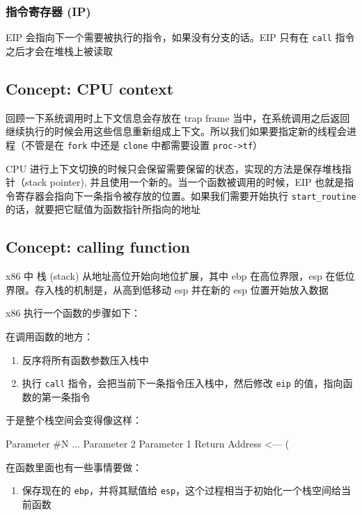 \subsubsection{指令寄存器 (IP)}

EIP 会指向下一个需要被执行的指令，如果没有分支的话。EIP 只有在 \texttt{call} 指令之后才会在堆栈上被读取

\subsection{Concept: CPU context}

回顾一下系统调用时上下文信息会存放在 trap frame 当中，在系统调用之后返回继续执行的时候会用这些信息重新组成上下文。所以我们如果要指定新的线程会进程（不管是在 \texttt{fork} 中还是 \texttt{clone} 中都需要设置 \texttt{proc->tf}）

CPU 进行上下文切换的时候只会保留需要保留的状态，实现的方法是保存堆栈指针（stack pointer), 并且使用一个新的。当一个函数被调用的时候，EIP 也就是指令寄存器会指向下一条指令被存放的位置。如果我们需要开始执行 \texttt{start\_routine} 的话，就要把它赋值为函数指针所指向的地址

\subsection{Concept: calling function}

x86 中 栈 (stack) 从地址高位开始向地位扩展，其中 ebp 在高位界限，esp 在低位界限。存入栈的机制是，从高到低移动 esp 并在新的 esp 位置开始放入数据

x86 执行一个函数的步骤如下：

在调用函数的地方：

\begin{enumerate}
	\item 反序将所有函数参数压入栈中
	\item 执行 \texttt{call} 指令，会把当前下一条指令压入栈中，然后修改 \texttt{eip} 的值，指向函数的第一条指令
\end{enumerate}

于是整个栈空间会变得像这样：

\begin{textcode}
	Parameter #N
	...
	Parameter 2
	Parameter 1
	Return Address <--- (%
\end{textcode}


在函数里面也有一些事情要做：

\begin{enumerate}
	\item 保存现在的 \texttt{ebp}，并将其赋值给 \texttt{esp}，这个过程相当于初始化一个栈空间给当前函数
\end{enumerate}

